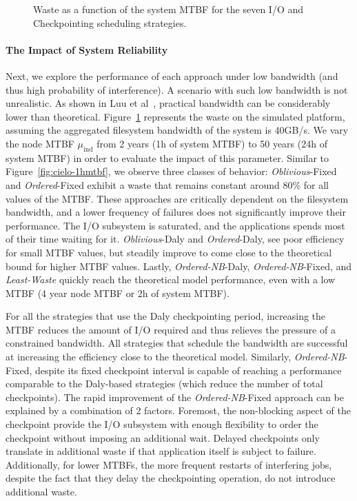 \documentclass[conference,nofonttune]{IEEEtran}
\newcommand{\muind}{\mu_{\text{ind}}}
\newcommand{\nocoop}{\emph{Oblivious}\xspace}
\newcommand{\fifoblock}{\emph{Ordered}\xspace}
\newcommand{\fifononblock}{\emph{Ordered-NB}\xspace}
\newcommand{\leastwaste}{\emph{Least-Waste}\xspace}
\def\propfixed{\nocoop-Fixed\xspace}
\def\propdaly{\nocoop-Daly\xspace}
\def\bfifofixed{\fifoblock-Fixed\xspace}
\def\bfifodaly{\fifoblock-Daly\xspace}
\def\fifofixed{\fifononblock-Fixed\xspace}
\def\fifodaly{\fifononblock-Daly\xspace}
\def\cooperative{\leastwaste}
\begin{document}
\begin{figure}
  \begin{center}
    \resizebox{1.05\linewidth}{!}{}
  \end{center}
  \caption{Waste as a function of the system MTBF for the
    seven I/O and Checkpointing scheduling strategies. \label{fig:cielo-40gbs}}
\end{figure}

\paragraph{The Impact of System Reliability}
Next, we explore the performance of each approach under low bandwidth (and
thus high probability of interference). A scenario with such low bandwidth is not
unrealistic.  As shown in Luu et al~\cite{Luu:2015:Multiplatform}, practical
bandwidth can be considerably lower than theoretical.
Figure~\ref{fig:cielo-40gbs} represents the waste on the
simulated platform, assuming the
aggregated filesystem bandwidth of the system is 40GB/s. We vary the node MTBF
$\muind$ from 2 years (1h of system MTBF) to 50 years (24h of system MTBF) in
order to evaluate the impact of this parameter. Similar to
Figure~\ref{fig:cielo-1hmtbf}, we observe three classes of behavior: \propfixed
and \bfifofixed exhibit a waste that remains constant around 80\% for all
values of the MTBF. These approaches are critically dependent on the filesystem
bandwidth, and a lower frequency of failures does not significantly improve
their performance. The I/O subsystem is saturated, and the applications spends
most of their time waiting for it.
%
\propdaly and \bfifodaly, see poor efficiency for small MTBF values, but
steadily improve to come close to the theoretical bound for higher MTBF values.
Lastly, \fifodaly, \fifofixed, and \cooperative quickly reach the theoretical
model performance, even with a low  MTBF (4 year node MTBF or 2h of
system MTBF).

For all the strategies that use the Daly checkpointing period, increasing the
MTBF reduces the amount of I/O required and thus relieves the pressure of a
constrained bandwidth. All strategies that schedule the bandwidth are
successful at increasing the efficiency close to the theoretical model.
%
Similarly, \fifofixed, despite its fixed checkpoint interval is capable of
reaching a performance comparable to the Daly-based strategies (which reduce the
number of total checkpoints). The rapid improvement of the \fifofixed approach can be
explained by a combination of 2 factors. Foremost, the non-blocking aspect of
the checkpoint provide the I/O subsystem with enough flexibility to order the
checkpoint without imposing an additional wait. Delayed checkpoints only translate
in additional waste if that application itself is subject to failure.
Additionally, for lower MTBFs, the more frequent restarts of interfering jobs,
despite the fact that they delay the checkpointing operation, do not introduce
additional waste.
\end{document}
